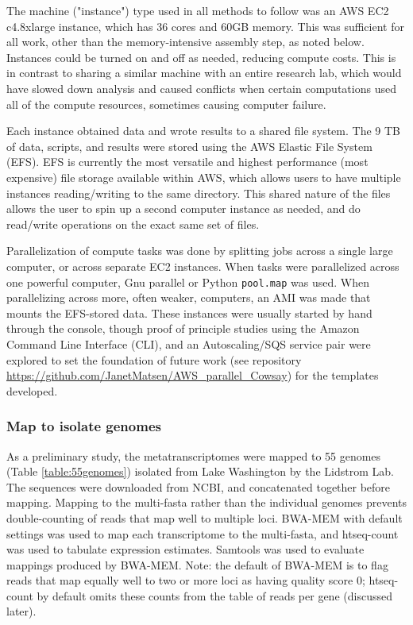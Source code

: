 The machine ("instance") type used in all methods to follow was an AWS EC2 c4.8xlarge instance, which has 36 cores and 60GB memory.
This was sufficient for all work, other than the memory-intensive assembly step, as noted below.
Instances could be turned on and off as needed, reducing compute costs.
This is in contrast to sharing a similar machine with an entire research lab, which would have slowed down analysis and caused conflicts when certain computations used all of the compute resources, sometimes causing computer failure.

Each instance obtained data and wrote results to a shared file system.
The 9 TB of data, scripts, and results were stored using the AWS Elastic File System (EFS).
EFS is currently the most versatile and highest performance (most expensive) file storage available within AWS, which allows users to have multiple instances reading/writing to the same directory.
This shared nature of the files allows the user to spin up a second computer instance as needed, and do read/write operations on the exact same set of files.

Parallelization of compute tasks was done by splitting jobs across a single large computer, or across separate EC2 instances.
When tasks were parallelized across one powerful computer, Gnu parallel or Python \texttt{pool.map} was used.
When parallelizing across more, often weaker, computers, an AMI was made that mounts the EFS-stored data.
These instances were usually started by hand through the console, though proof of principle studies using the Amazon Command Line Interface (CLI),
    and an Autoscaling/SQS service pair were explored to set the foundation of future work (see repository \url{https://github.com/JanetMatsen/AWS_parallel_Cowsay}) for the templates developed.

\subsubsection{Map to isolate genomes}
As a preliminary study, the metatranscriptomes were mapped to 55 genomes (Table \ref{table:55genomes}) isolated from Lake Washington by the Lidstrom Lab.
The sequences were downloaded from NCBI, and concatenated together before mapping.
Mapping to the multi-fasta rather than the individual genomes prevents double-counting of reads that map well to multiple loci.
BWA-MEM \cite{li2009} with default settings was used to map each transcriptome to the multi-fasta, and htseq-count \cite{anders2014} was used to tabulate expression estimates.
Samtools \cite{li2009samtools} was used to evaluate mappings produced by BWA-MEM.
Note: the default of BWA-MEM is to flag reads that map equally well to two or more loci as having quality score 0; htseq-count by default omits these counts from the table of reads per gene (discussed later).

